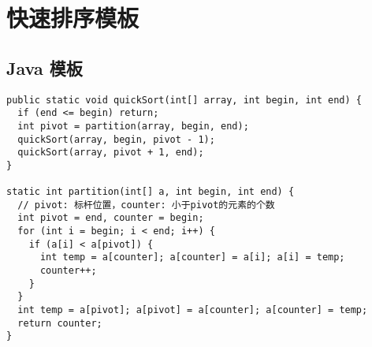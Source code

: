 \newpage
\section{快速排序模板}

\subsection{Java 模板}

\begin{verbatim}
public static void quickSort(int[] array, int begin, int end) {
  if (end <= begin) return;
  int pivot = partition(array, begin, end);
  quickSort(array, begin, pivot - 1);
  quickSort(array, pivot + 1, end);
}

static int partition(int[] a, int begin, int end) {
  // pivot: 标杆位置，counter: 小于pivot的元素的个数
  int pivot = end, counter = begin;
  for (int i = begin; i < end; i++) {
    if (a[i] < a[pivot]) {
      int temp = a[counter]; a[counter] = a[i]; a[i] = temp;
      counter++;
    }
  }
  int temp = a[pivot]; a[pivot] = a[counter]; a[counter] = temp;
  return counter;
}
\end{verbatim}
